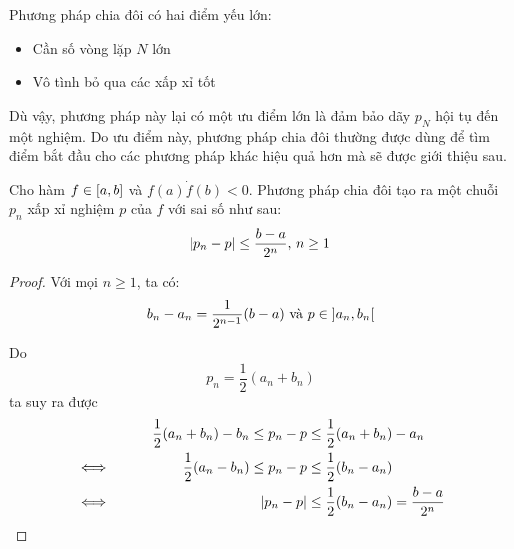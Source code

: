 \documentclass[../../Lectures.tex]{subfiles}
\begin{document}
Phương pháp chia đôi có hai điểm yếu lớn:

\begin{itemize}
    \item Cần số vòng lặp \(N\) lớn
    \item Vô tình bỏ qua các xấp xỉ tốt
\end{itemize}

Dù vậy, phương pháp này lại có một ưu điểm lớn là đảm bảo dãy \(p_N\) hội tụ đến
một nghiệm. Do ưu điểm này, phương pháp chia đôi thường được dùng để tìm điểm
bắt đầu cho các phương pháp khác hiệu quả hơn mà sẽ được giới thiệu sau.

\begin{theorem}
    Cho hàm \(f \in \interval{a}{b}\) và \(f(a) \dot f(b) < 0\). Phương pháp
    chia đôi tạo ra một chuỗi \(p_n\) xấp xỉ nghiệm \(p\) của \(f\) với sai số
    như sau:
    \[\abs{p_n - p} \leq \frac{b - a}{2^n} \text{, } n \geq 1\]
\end{theorem}

\begin{proof}
    Với mọi \(n \geq 1\), ta có:
    \[b_n - a_n = \frac{1}{2^{n - 1}} (b - a) \text{ và } p \in \interval[open]{a_n}{b_n}\]

    Do
    \[p_n = \frac{1}{2} (a_n + b_n)\]
    ta suy ra được
    \begin{align*}    %
        &\qquad& \frac{1}{2} (a_n + b_n) - b_n \leq p_n - p &\leq \frac{1}{2} (a_n + b_n) - a_n \\
        \iff&&   \frac{1}{2} (a_n - b_n)       \leq p_n - p &\leq \frac{1}{2} (b_n - a_n)       \\
        \iff&&                                \abs{p_n - p} &\leq \frac{1}{2} (b_n - a_n) = \frac{b - a}{2^n}
    \end{align*}
\end{proof}
\end{document}
